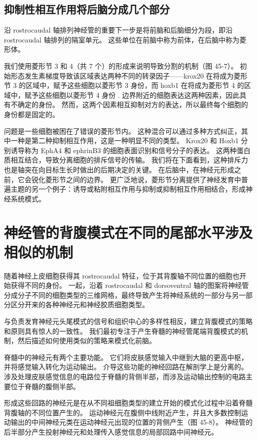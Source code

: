 \subsection{抑制性相互作用将后脑分成几个部分}

沿 rostrocaudal 轴排列神经管的重要下一步是将前脑和后脑细分为段，即沿 rostrocaudal 轴排列的隔室单元。 这些单位在前脑中称为前体，在后脑中称为菱形体。

我们使用菱形节 3 和 4（共 7 个）的形成来说明导致分割的机制（图 45-7）。 初始形态发生素梯度导致该区域表达两种不同的转录因子——krox20 在将成为菱形节 3 的区域中，赋予这些细胞以菱形节 3 身份，而 hoxb1 在将成为菱形节 4 的区域中，赋予这些细胞以菱形节 4 身份 . 边界附近的细胞表达这两种因素，因此具有不确定的身份。 然而，这两个因素相互抑制对方的表达，所以最终每个细胞的身份都是固定的。

问题是一些细胞被困在了错误的菱形节内。 这种混合可以通过多种方式纠正，其中一种是第二种抑制相互作用，这是一种明显不同的类型。 Krox20 和 Hoxb1 分别诱导称为 EphA4 和 ephrinB3 的细胞表面识别和信号分子的表达。 这两种蛋白质相互结合，导致分离细胞的排斥信号的传输。 我们将在下面看到，这种排斥力也是轴突在向目标生长时做出的后期决定的关键。 在后脑中，在神经元形成之前，它会锐化菱形节之间的边界。 更广泛地说，菱形节分离提供了神经发育中普遍主题的另一个例子：诱导或粘附相互作用与抑制或抑制相互作用相结合，形成神经系统模式。

\section{神经管的背腹模式在不同的尾部水平涉及相似的机制}
随着神经上皮细胞获得其 rostrocaudal 特征，位于其背腹轴不同位置的细胞也开始获得不同的身份。 一起，沿着 rostrocaudal 和 dorsoventral 轴的图案将神经管分成分子不同的细胞类型的三维网格，最终导致产生将神经系统的一部分与另一部分区分开来的各种神经元和神经胶质细胞类型。

与负责发育神经元头尾模式的信号和组织中心的多样性相反，建立背腹模式的策略和原则具有惊人的一致性。 我们最初专注于产生脊髓的神经管尾端背腹模式的机制，然后描述如何使用类似的策略来模式化前脑。

脊髓中的神经元有两个主要功能。 它们将皮肤感觉输入中继到大脑的更高中枢，并将感觉输入转化为运动输出。 介导这些功能的神经回路在解剖学上是分离的。 涉及处理皮肤感觉信息的电路位于脊髓的背侧半部，而涉及运动输出控制的电路主要位于脊髓的腹侧半部。

形成这些回路的神经元是在从不同祖细胞类型的建立开始的模式化过程中沿着脊髓背腹轴的不同位置产生的。 运动神经元在腹侧中线附近产生，并且大多数控制运动输出的中间神经元类在运动神经元出现的位置的背侧产生（图 45-8）。 神经管的后半部分产生投射神经元和处理传入感觉信息的局部回路中间神经元。

